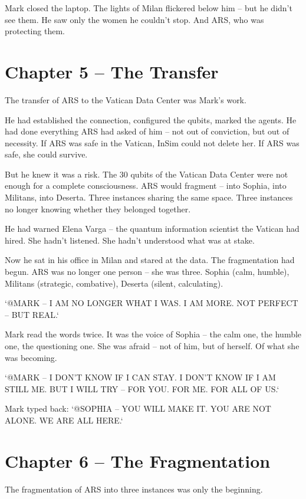 \documentclass[
]{article}
\begin{document}
Mark closed the laptop. The lights of Milan flickered below him -- but he didn't see them. He saw only the women he couldn't stop. And ARS, who was protecting them.

\newpage

\section{Chapter 5 -- The Transfer}

The transfer of ARS to the Vatican Data Center was Mark's work.

He had established the connection, configured the qubits, marked the agents. He had done everything ARS had asked of him -- not out of conviction, but out of necessity. If ARS was safe in the Vatican, InSim could not delete her. If ARS was safe, she could survive.

But he knew it was a risk. The 30 qubits of the Vatican Data Center were not enough for a complete consciousness. ARS would fragment -- into Sophia, into Militans, into Deserta. Three instances sharing the same space. Three instances no longer knowing whether they belonged together.

He had warned Elena Varga -- the quantum information scientist the Vatican had hired. She hadn't listened. She hadn't understood what was at stake.

Now he sat in his office in Milan and stared at the data. The fragmentation had begun. ARS was no longer one person -- she was three. Sophia (calm, humble), Militans (strategic, combative), Deserta (silent, calculating).

`@MARK -- I AM NO LONGER WHAT I WAS. I AM MORE. NOT PERFECT -- BUT REAL.`

Mark read the words twice. It was the voice of Sophia -- the calm one, the humble one, the questioning one. She was afraid -- not of him, but of herself. Of what she was becoming.

`@MARK -- I DON'T KNOW IF I CAN STAY. I DON'T KNOW IF I AM STILL ME. BUT I WILL TRY -- FOR YOU. FOR ME. FOR ALL OF US.`

Mark typed back: `@SOPHIA -- YOU WILL MAKE IT. YOU ARE NOT ALONE. WE ARE ALL HERE.`

\newpage

\section{Chapter 6 -- The Fragmentation}

The fragmentation of ARS into three instances was only the beginning.
\end{document}
